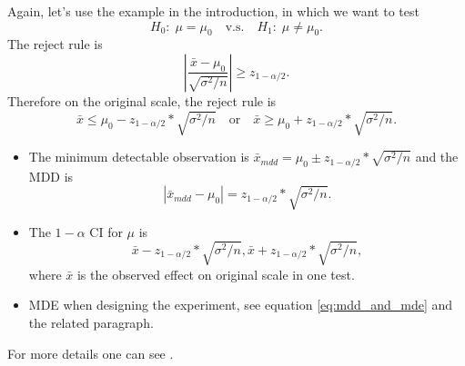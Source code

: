 \documentclass[a4paper,12pt]{article}
\begin{document}
Again, let's use the example in the introduction, in which we want to test
\[
  H_0:\;\mu = \mu_0
  \quad
  \text{v.s.}
  \quad
  H_1:\;\mu\neq\mu_0
  .
\]
The reject rule is
\[
  \left|
    \frac{\bar{x} - \mu_0}{\sqrt{\sigma^2 / n}}
  \right|
  \geq
  z_{1 - \alpha / 2}
  .
\]
Therefore on the original scale, the reject rule is
\[
  \bar{x} \leq \mu_0 - z_{1 - \alpha / 2} * \sqrt{\sigma^2 / n}
  \quad\text{or}\quad
  \bar{x} \geq \mu_0 + z_{1 - \alpha / 2} * \sqrt{\sigma^2 / n}
  .
\]
\begin{itemize}
\item The minimum detectable observation is $\bar{x}_{mdd} = \mu_0 \pm z_{1 - \alpha / 2} * \sqrt{\sigma^2 / n}$ and the MDD is
  \[
    \left|\bar{x}_{mdd} - \mu_0\right| = z_{1 - \alpha / 2} * \sqrt{\sigma^2 / n}
    .
  \]
\item The $1 - \alpha$ CI for $\mu$ is
  \[
    \bar{x} - z_{1 - \alpha / 2} * \sqrt{\sigma^2 / n}, \bar{x} + z_{1 - \alpha / 2} * \sqrt{\sigma^2 / n}
    ,
  \]
  where $\bar{x}$ is the observed effect on original scale in one test.
\item MDE when designing the experiment, see equation \eqref{eq:mdd_and_mde} and the related paragraph.
\end{itemize}






For more details one can see \citet{Mair2020p2109-2123}.




\end{document}
